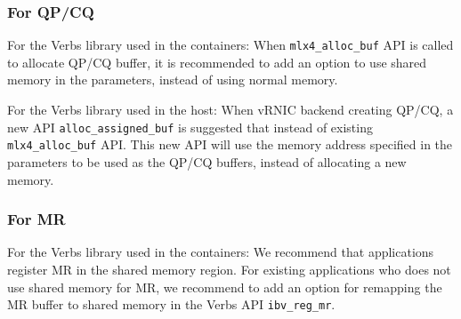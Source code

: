 
\subsubsection{For QP/CQ}
For the Verbs library used in the containers: When \texttt{mlx4\_alloc\_buf} API is called to allocate QP/CQ buffer, it is recommended to add an option to use shared memory in the parameters, instead of using normal memory.

For the Verbs library used in the host: When vRNIC backend creating QP/CQ, a new API \texttt{alloc\_assigned\_buf} is suggested that instead of existing \texttt{mlx4\_alloc\_buf} API. This new API will use the memory address specified in the parameters to be used as the QP/CQ buffers, instead of allocating a new memory.


\subsubsection{For MR}
For the Verbs library used in the containers: We recommend that applications register MR in the shared memory region. For existing applications who does not use shared memory for MR, we recommend to add an option for remapping the MR buffer to shared memory in the Verbs API \texttt{ibv\_reg\_mr}.


